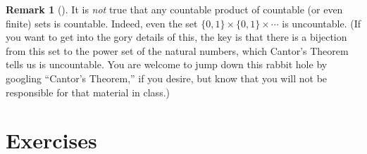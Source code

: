 \documentclass[10pt,]{book}
\theoremstyle{plain}
\theoremstyle{definition}
\theoremstyle{definition}
\newtheorem{remark}[theorem]{Remark}
\theoremstyle{definition}
\theoremstyle{definition}
\numberwithin{equation}{section}
\begin{document}
\begin{remark}[]\label{remark-4}
It is \emph{not} true that any countable product of countable (or even finite) sets is countable. Indeed, even the set \(\{0,1\}\times \{0,1\}\times \cdots\) is uncountable. (If you want to get into the gory details of this, the key is that there is a bijection from this set to the power set of the natural numbers, which Cantor's Theorem tells us is uncountable.  You are welcome to jump down this rabbit hole by googling ``Cantor's Theorem,'' if you desire, but know that you will not be responsible for that material in class.)%
\end{remark}
\typeout{************************************************}
\typeout{************************************************}
\section[{Exercises}]{Exercises}\label{exercises-1}
\end{document}
